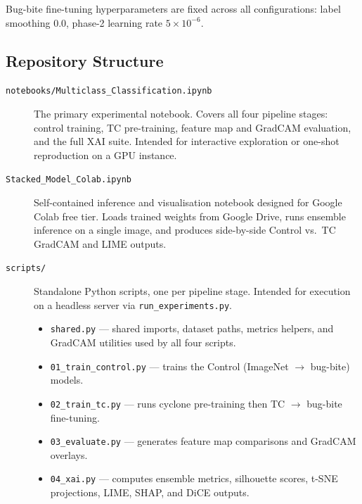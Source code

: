 \documentclass[12pt,a4paper]{article}
\begin{document}
Bug-bite fine-tuning hyperparameters are fixed across all configurations:
label smoothing 0.0, phase-2 learning rate $5\times10^{-6}$.

\subsection{Repository Structure}
\label{sec:pg-repo}

\begin{description}
    \item[\texttt{notebooks/Multiclass\_Classification.ipynb}]
          The primary experimental notebook. Covers all four pipeline stages:
          control training, TC pre-training, feature map and GradCAM evaluation,
          and the full XAI suite. Intended for interactive exploration or
          one-shot reproduction on a GPU instance.

    \item[\texttt{Stacked\_Model\_Colab.ipynb}]
          Self-contained inference and visualisation notebook designed for
          Google Colab free tier. Loads trained weights from Google Drive,
          runs ensemble inference on a single image, and produces side-by-side
          Control vs.\ TC GradCAM and LIME outputs.

    \item[\texttt{scripts/}]
          Standalone Python scripts, one per pipeline stage. Intended for
          execution on a headless server via \texttt{run\_experiments.py}.
          \begin{itemize}
              \item \texttt{shared.py} --- shared imports, dataset paths,
                    metrics helpers, and GradCAM utilities used by all four scripts.
              \item \texttt{01\_train\_control.py} --- trains the Control
                    (ImageNet $\rightarrow$ bug-bite) models.
              \item \texttt{02\_train\_tc.py} --- runs cyclone pre-training then
                    TC $\rightarrow$ bug-bite fine-tuning.
              \item \texttt{03\_evaluate.py} --- generates feature map comparisons
                    and GradCAM overlays.
              \item \texttt{04\_xai.py} --- computes ensemble metrics, silhouette
                    scores, t-SNE projections, LIME, SHAP, and DiCE outputs.
          \end{itemize}


\end{description}
\end{document}
